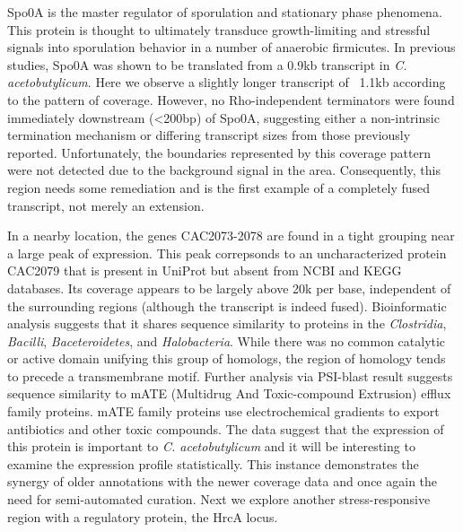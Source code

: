 
Spo0A is the master regulator of sporulation and stationary phase phenomena. This protein is thought to ultimately transduce growth-limiting and stressful signals into sporulation behavior in a number of anaerobic firmicutes. In previous studies, Spo0A was shown to be translated from a 0.9kb transcript in \textit{C. acetobutylicum}. Here we observe a slightly longer transcript of ~1.1kb according to the pattern of coverage. However, no Rho-independent terminators were found immediately downstream (\textless  200bp) of Spo0A, suggesting either a non-intrinsic termination mechanism or differing transcript sizes from those previously reported. Unfortunately, the boundaries represented by this coverage pattern were not detected due to the background signal in the area. Consequently, this region needs some remediation and is the first example of a completely fused transcript, not merely an extension.

In a nearby location, the genes CAC2073-2078 are found in a tight grouping near a large peak of expression. This peak correpsonds to an uncharacterized protein CAC2079 that is present in UniProt but absent from NCBI and KEGG databases. Its coverage appears to be largely above 20k per base, independent of the surrounding regions (although the transcript is indeed fused). Bioinformatic analysis suggests that it shares sequence similarity to proteins in the \textit{Clostridia}, \textit{Bacilli}, \textit{Baceteroidetes}, and \textit{Halobacteria}. While there was no common catalytic or active domain unifying this group of homologs, the region of homology tends to precede a transmembrane motif. Further analysis via PSI-blast result suggests sequence similarity to mATE (Multidrug And Toxic-compound Extrusion) efflux family proteins. mATE family proteins use electrochemical gradients to export antibiotics and other toxic compounds. The data suggest that the expression of this protein is important to \textit{C. acetobutylicum} and it will be interesting to examine the expression profile statistically. This instance demonstrates the synergy of older annotations with the newer coverage data and once again the need for semi-automated curation. Next we explore another stress-responsive region with a regulatory protein, the HrcA locus.

